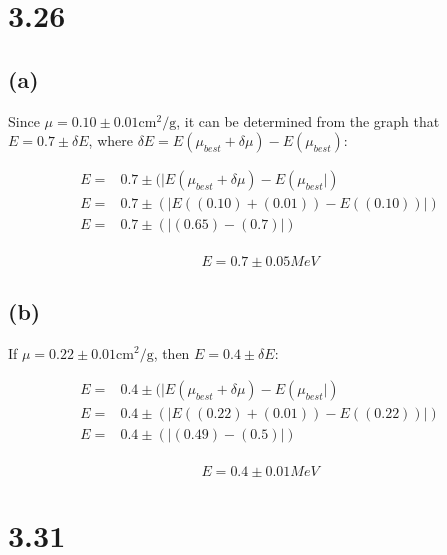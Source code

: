 \documentclass[12pt]{article}
\begin{document}


\section*{3.26}

\subsection*{(a)}

Since \( \mu = 0.10 \pm 0.01 \si{\centi\meter\squared\per\gram} \), it can be
determined from the graph that \( E = 0.7 \pm \delta E\), where \( \delta E
= E(\mu_{best} + \delta \mu) - E(\mu_{best}) \):

\begin{align*}
  E ={}& 0.7 \pm (|E(\mu_{best} + \delta \mu) - E(\mu_{best}|) \\
  E ={}& 0.7 \pm (|E((0.10) + (0.01)) - E((0.10))|)  \\
  E ={}& 0.7 \pm (|(0.65) - (0.7)|)  \\
\end{align*}

\begin{tcolorbox}
  \[ E = 0.7 \pm 0.05 MeV \nonumber \]
\end{tcolorbox}

\subsection*{(b)}

If \( \mu = 0.22 \pm 0.01 \si{\centi\meter\squared\per\gram} \), then \( E = 0.4 \pm
\delta E \):

\begin{align*}
  E ={}& 0.4 \pm (|E(\mu_{best} + \delta \mu) - E(\mu_{best}|) \\
  E ={}& 0.4 \pm (|E((0.22) + (0.01)) - E((0.22))|)  \\
  E ={}& 0.4 \pm (|(0.49) - (0.5)|)  \\
\end{align*}

\begin{tcolorbox}
  \[ E = 0.4 \pm 0.01 MeV \nonumber \]
\end{tcolorbox}



\section*{3.31}
\end{document}
